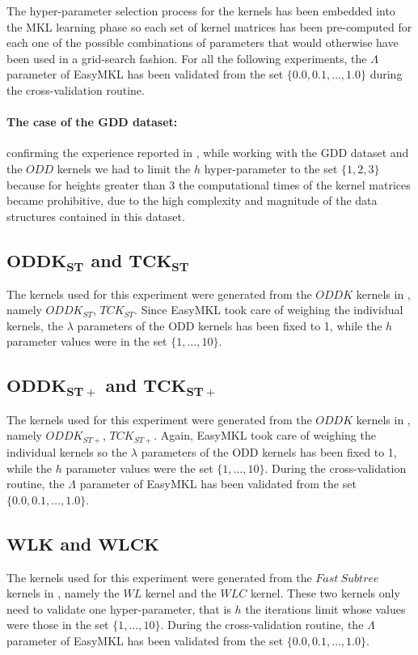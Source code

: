 The hyper-parameter selection process for the kernels has been embedded
into the MKL learning phase so each set of kernel matrices has been
pre-computed for each one of the possible combinations of parameters that would
otherwise have been used in a grid-search fashion.
For all the following experiments, the $\Lambda$ parameter of EasyMKL has been
validated from the set $\{0.0, 0.1,\dots,1.0\}$ during the cross-validation
routine.

\paragraph{The case of the GDD dataset:}
\label{par:gdd}
confirming the experience reported in \cite{rtesselli}, while working with the GDD
dataset and the $ODD$ kernels we had to limit the $h$ hyper-parameter to the set
$\{1,2,3\}$ because for heights greater than 3 the computational times of the
kernel matrices became prohibitive, due to the high complexity and magnitude
of the data structures contained in this dataset.


\subsection[$ODDK_{ST}$ and $TCK_{ST}$]{$\boldsymbol{ODDK_{ST}}$ and $\boldsymbol{TCK_{ST}}$}
The kernels used for this experiment were generated from the $ODDK$ kernels
in \cite{DBLP:conf/sdm/MartinoNS12, Navarin2015}, namely $ODDK_{ST}$, $TCK_{ST}$.
Since EasyMKL took care of weighing the individual kernels, the $\lambda$
parameters of the ODD kernels has been fixed to 1, while the $h$ parameter
values were in the set $\{1,\dots,10\}$.

\subsection[$ODDK_{ST+}$ and $TCK_{ST+}$]{$\boldsymbol{ODDK_{ST+}}$ and $\boldsymbol{TCK_{ST+}}$}
The kernels used for this experiment were generated from the $ODDK$ kernels
in \cite{dasanmartino2015exploiting, rtesselli}, namely $ODDK_{ST+}$, $TCK_{ST+}$.
Again, EasyMKL took care of weighing the individual kernels so the $\lambda$
parameters of the ODD kernels has been fixed to 1, while the $h$ parameter
values were the set $\{1,\dots,10\}$.
During the cross-validation routine, the $\Lambda$ parameter of EasyMKL has been
validated from the set $\{0.0, 0.1,\dots,1.0\}$.

\subsection[$WL$ and $WLC$]{$\boldsymbol{WLK}$ and $\boldsymbol{WLCK}$}
The kernels used for this experiment were generated from the $Fast~Subtree$ kernels
in \cite{NIPS2009_3813, rtesselli}, namely the $WL$ kernel and the $WLC$ kernel.
These two kernels only need to validate one hyper-parameter, that is $h$ the iterations
limit whose values were those in the set $\{1,\dots,10\}$.
During the cross-validation routine, the $\Lambda$ parameter of EasyMKL has been
validated from the set $\{0.0, 0.1,\dots,1.0\}$.

